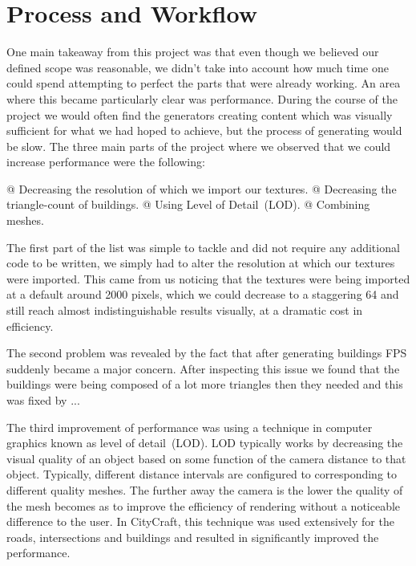 \section{Process and Workflow}

One main takeaway from this project was that even though we believed our defined scope was reasonable, we didn't take into account how much time one could spend attempting to perfect the parts that were already working.
An area where this became particularly clear was performance.
During the course of the project we would often find the generators creating content which was visually sufficient for what we had hoped to achieve, but the process of generating would be slow. 
The three main parts of the project where we observed that we could increase performance were the following:

\begin{easylist}
  @ Decreasing the resolution of which we import our textures.
  @ Decreasing the triangle-count of buildings.
  @ Using Level of Detail~(LOD).
  @ Combining meshes. 
 \end{easylist}
 
The first part of the list was simple to tackle and did not require any additional code to be written, we simply had to alter the resolution at which our textures were imported.
This came from us noticing that the textures were being imported at a default around 2000 pixels, which we could decrease to a staggering 64 and still reach almost indistinguishable results visually, at a dramatic cost in efficiency. 

The second problem was revealed by the fact that after generating buildings FPS suddenly became a major concern. 
After inspecting this issue we found that the buildings were being composed of a lot more triangles then they needed and this was fixed by ...

The third improvement of performance was using a technique in computer graphics known as level of detail~(LOD).
LOD typically works by decreasing the visual quality of an object based on some function of the camera distance to that object.
Typically, different distance intervals are configured to corresponding to different quality meshes.
The further away the camera is the lower the quality of the mesh becomes as to improve the efficiency of rendering without a noticeable difference to the user.
In CityCraft, this technique was used extensively for the roads, intersections and buildings and resulted in significantly improved the performance.

